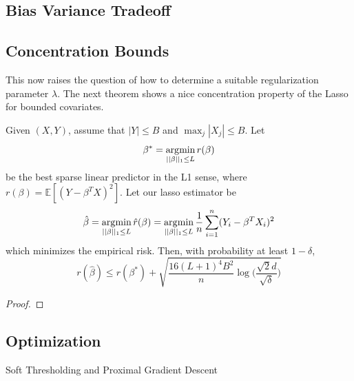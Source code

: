 \subsection{Bias Variance Tradeoff}

\subsection{Concentration Bounds}

  This now raises the question of how to determine a suitable regularization parameter $\lambda$. The next theorem shows a nice concentration property of the Lasso for bounded covariates. 

  \begin{theorem}
    Given $(X, Y)$, assume that $|Y| \leq B$ and $\max_j |X_j| \leq B$. Let 
    \begin{equation}
      \beta^\ast = \operatorname*{\arg\!\min}_{||\beta||_1 \leq L} r(\beta)
    \end{equation}
    be the best sparse linear predictor in the L1 sense, where $r(\beta) = \mathbb{E}[ (Y - \beta^T X)^2]$. Let our lasso estimator be 
    \begin{equation}
      \hat{\beta} = \operatorname*{\arg\!\min}_{||\beta||_1 \leq L} \hat{r}(\beta) = \operatorname*{\arg\!\min}_{||\beta||_1 \leq L} \frac{1}{n} \sum_{i=1}^n (Y_i - \beta^T X_i)^2
    \end{equation}
    which minimizes the empirical risk. Then, with probability at least $1 - \delta$, 
    \begin{equation}
      r(\hat{\beta}) \leq r(\beta^\ast) + \sqrt{\frac{16(L+1)^4 B^2}{n} \log \bigg( \frac{\sqrt{2} d}{\sqrt{\delta}} \bigg)} 
    \end{equation}
  \end{theorem}
  \begin{proof}
    
  \end{proof}

\subsection{Optimization}

  Soft Thresholding and Proximal Gradient Descent
